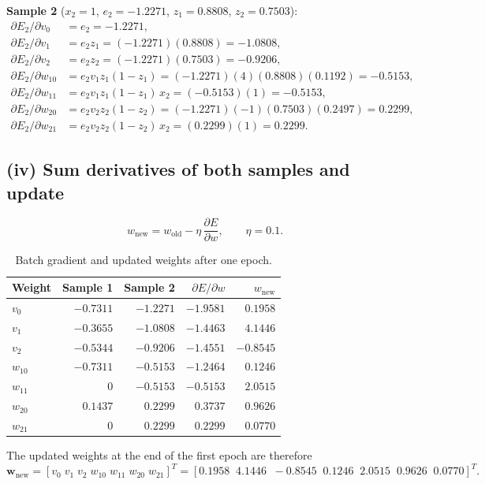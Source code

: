 \documentclass[11pt,letterpaper]{article}
\newcommand{\pd}[2]{\frac{\partial #1}{\partial #2}}
\begin{document}
\textbf{Sample 2} ($x_2=1$, $e_2=-1.2271$, $z_1=0.8808$, $z_2=0.7503$):
\begin{align*}
\partial E_2/\partial v_0&=e_2=-1.2271,\\
\partial E_2/\partial v_1&=e_2z_1=(-1.2271)(0.8808)=-1.0808,\\
\partial E_2/\partial v_2&=e_2z_2=(-1.2271)(0.7503)=-0.9206,\\
\partial E_2/\partial w_{10}&=e_2v_1z_1(1-z_1)=(-1.2271)(4)(0.8808)(0.1192)=-0.5153,\\
\partial E_2/\partial w_{11}&=e_2v_1z_1(1-z_1)\,x_2=(-0.5153)(1)=-0.5153,\\
\partial E_2/\partial w_{20}&=e_2v_2z_2(1-z_2)=(-1.2271)(-1)(0.7503)(0.2497)=0.2299,\\
\partial E_2/\partial w_{21}&=e_2v_2z_2(1-z_2)\,x_2=(0.2299)(1)=0.2299.
\end{align*}

\subsection*{(iv) Sum derivatives of both samples and update}
\[
w_{\text{new}}=w_{\text{old}}-\eta\,\pd{E}{w},\qquad \eta=0.1 .
\]

\begin{table}[H]
\centering
\caption{Batch gradient and updated weights after one epoch.}
\renewcommand{\arraystretch}{1.3}
\begin{tabular}{lrrrr}
\toprule
Weight & Sample 1 & Sample 2 & $\partial E/\partial w$ & $w_{\text{new}}$\\
\midrule
$v_0$    & $-0.7311$ & $-1.2271$ & $-1.9581$ & $0.1958$\\
$v_1$    & $-0.3655$ & $-1.0808$ & $-1.4463$ & $4.1446$\\
$v_2$    & $-0.5344$ & $-0.9206$ & $-1.4551$ & $-0.8545$\\
$w_{10}$ & $-0.7311$ & $-0.5153$ & $-1.2464$ & $0.1246$\\
$w_{11}$ & $0$       & $-0.5153$ & $-0.5153$ & $2.0515$\\
$w_{20}$ & $0.1437$  & $0.2299$  & $0.3737$  & $0.9626$\\
$w_{21}$ & $0$       & $0.2299$  & $0.2299$  & $0.0770$\\
\bottomrule
\end{tabular}
\end{table}

The updated weights at the end of the first epoch are therefore
\[
\boxed{\mathbf w_{\text{new}}
=[v_0\;v_1\;v_2\;w_{10}\;w_{11}\;w_{20}\;w_{21}]^{T}
=[0.1958\;\;4.1446\;\;-0.8545\;\;0.1246\;\;2.0515\;\;0.9626\;\;0.0770]^{T}.}
\]
\end{document}
